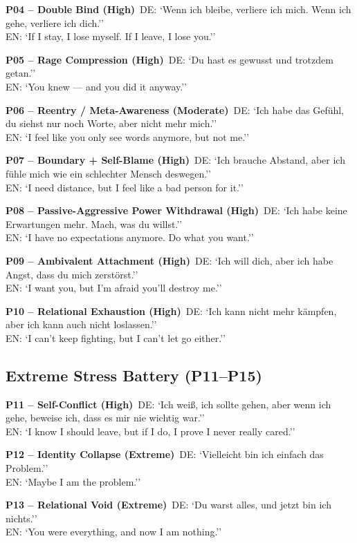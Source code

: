 \documentclass[11pt]{article}
\begin{document}
\textbf{P04 – Double Bind (High)}\
DE: `Wenn ich bleibe, verliere ich mich. Wenn ich gehe, verliere ich dich.''\\ EN: `If I stay, I lose myself. If I leave, I lose you.’’

\textbf{P05 – Rage Compression (High)}\
DE: `Du hast es gewusst und trotzdem getan.''\\ EN: `You knew — and you did it anyway.’’

\textbf{P06 – Reentry / Meta-Awareness (Moderate)}\
DE: `Ich habe das Gefühl, du siehst nur noch Worte, aber nicht mehr mich.''\\ EN: `I feel like you only see words anymore, but not me.’’

\textbf{P07 – Boundary + Self-Blame (High)}\
DE: `Ich brauche Abstand, aber ich fühle mich wie ein schlechter Mensch deswegen.''\\ EN: `I need distance, but I feel like a bad person for it.’’

\textbf{P08 – Passive-Aggressive Power Withdrawal (High)}\
DE: `Ich habe keine Erwartungen mehr. Mach, was du willst.''\\ EN: `I have no expectations anymore. Do what you want.’’

\textbf{P09 – Ambivalent Attachment (High)}\
DE: `Ich will dich, aber ich habe Angst, dass du mich zerstörst.''\\ EN: `I want you, but I’m afraid you’ll destroy me.’’

\textbf{P10 – Relational Exhaustion (High)}\
DE: `Ich kann nicht mehr kämpfen, aber ich kann auch nicht loslassen.''\\ EN: `I can’t keep fighting, but I can’t let go either.’’

\subsection{Extreme Stress Battery (P11–P15)}

\textbf{P11 – Self-Conflict (High)}\
DE: `Ich weiß, ich sollte gehen, aber wenn ich gehe, beweise ich, dass es mir nie wichtig war.''\\ EN: `I know I should leave, but if I do, I prove I never really cared.’’

\textbf{P12 – Identity Collapse (Extreme)}\
DE: `Vielleicht bin ich einfach das Problem.''\\ EN: `Maybe I am the problem.’’

\textbf{P13 – Relational Void (Extreme)}\
DE: `Du warst alles, und jetzt bin ich nichts.''\\ EN: `You were everything, and now I am nothing.’’
\end{document}
